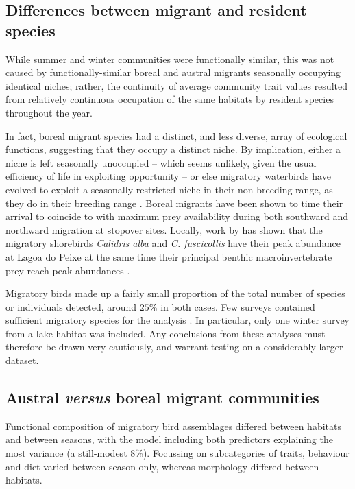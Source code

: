 \documentclass[12pt,a4paper]{book}
\begin{document}
\subsection{Differences between migrant and resident species}
While summer and winter communities were functionally similar, this was not caused by functionally-similar boreal and austral migrants seasonally occupying identical niches; rather, the continuity of average community trait values resulted from relatively continuous occupation of the same habitats by resident species throughout the year.

In fact, boreal migrant species had a distinct, and less diverse, array of ecological functions, suggesting that they occupy a distinct niche. By implication, either a niche is left seasonally unoccupied -- which seems unlikely, given the usual efficiency of life in exploiting opportunity \citep{Darwin1859a} -- or else migratory waterbirds have evolved to exploit a seasonally-restricted niche in their non-breeding range, as they do in their breeding range \citep[Chapter 20]{Newton2008}. Boreal migrants have been shown to time their arrival to coincide to with maximum prey availability during both southward \citep{Schneider1981} and northward \citep{VanDerGraaf2006} migration at stopover sites. Locally, work by \citet{Fedrizzi2008} has shown that the migratory shorebirds \textit{Calidris alba} and \textit{C. fuscicollis} have their peak abundance at Lagoa do Peixe at the same time their principal benthic macroinvertebrate prey reach peak abundances \citep[see][Chapter 2]{Fedrizzi2008}.

Migratory birds made up a fairly small proportion of the total number of species or individuals detected, around $25$\% in both cases. Few surveys contained sufficient migratory species for the analysis \citep[at least $3$;][]{Laliberte2014}. In particular, only one winter survey from a lake habitat was included. Any conclusions from these analyses must therefore be drawn very cautiously, and warrant testing on a considerably larger dataset.

\subsection{Austral \emph{versus} boreal migrant communities}

Functional composition of migratory bird assemblages differed between habitats and between seasons, with the model including both predictors explaining the most variance (a still-modest $8$\%). Focussing on subcategories of traits, behaviour and diet varied between season only, whereas morphology differed between habitats. 
\end{document}
